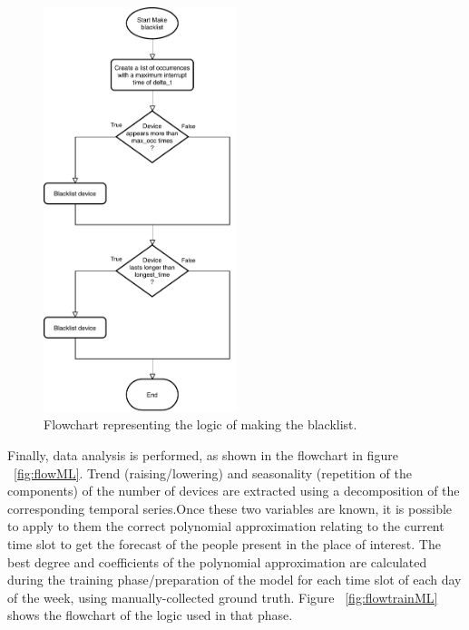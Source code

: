 \begin{figure}[h]
\centering 
\includegraphics[width=0.5\textwidth]{images/flowblacklist} 
\caption{Flowchart representing the logic of making the blacklist.}
\label{fig:flowblacklist}
\end{figure}

Finally, data analysis is performed, as shown in the flowchart in figure ~\ref{fig:flowML}. Trend (raising/lowering) and seasonality (repetition of the components) of the number of devices are extracted using a decomposition of the corresponding temporal series.Once these two variables are known, it is possible to apply to them the correct polynomial approximation relating to the current time slot to get the forecast of the people present in the place of interest. The best degree and coefficients of the polynomial approximation are calculated during the training phase/preparation of the model for each time slot of each day of the week, using manually-collected ground truth. Figure ~\ref{fig:flowtrainML} shows the flowchart of the logic used in that phase.


